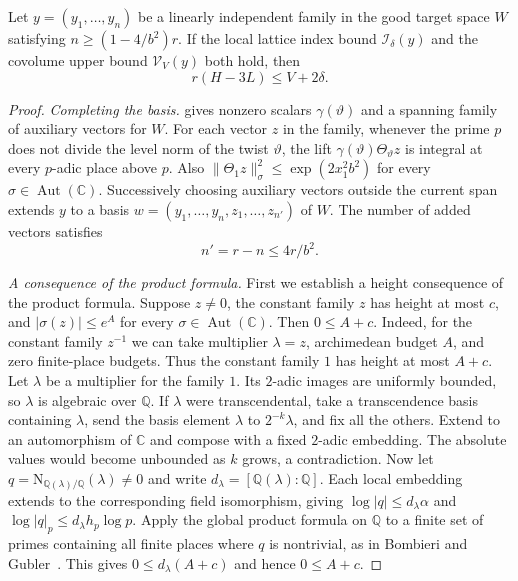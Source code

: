 \begin{theorem}
\label{thm:long-forms}
\emitthmsource
Let $y=(y_1,\dots,y_n)$ be a linearly independent family in the good target space $W$ satisfying $n\ge(1-4/b^2)r$. If the local lattice index bound $\mathcal I_\delta(y)$ and the covolume upper bound $\mathcal V_V(y)$ both hold, then
\begin{equation}
  r(H-3L)\le V+2\delta.
\label{eq:c-long-forms}
\end{equation}
\end{theorem}
\begin{proof}
\emph{Completing the basis.}
 gives nonzero scalars $\gamma(\vartheta)$ and a spanning family of auxiliary vectors for $W$. For each vector $z$ in the family, whenever the prime $p$ does not divide the level norm of the twist $\vartheta$, the lift $\gamma(\vartheta)\Theta_\vartheta z$ is integral at every $p$-adic place above $p$. Also $\|\Theta_1 z\|_\sigma^2\le \exp(2x_1^2b^2)$ for every $\sigma\in\operatorname{Aut}(\mathbb C)$. Successively choosing auxiliary vectors outside the current span extends $y$ to a basis $w=(y_1,\dots,y_n,z_1,\dots,z_{n'})$ of $W$. The number of added vectors satisfies
\[
 n'=r-n\le 4r/b^2.
\]

\emph{A consequence of the product formula.}
First we establish a height consequence of the product formula. Suppose $z\ne0$, the constant family $z$ has height at most $c$, and $|\sigma(z)|\le e^A$ for every $\sigma\in\operatorname{Aut}(\mathbb C)$. Then $0\le A+c$. Indeed, for the constant family $z^{-1}$ we can take multiplier $\lambda=z$, archimedean budget $A$, and zero finite-place budgets. Thus the constant family $1$ has height at most $A+c$. Let $\lambda$ be a multiplier for the family $1$. Its $2$-adic images are uniformly bounded, so $\lambda$ is algebraic over $\mathbb Q$. If $\lambda$ were transcendental, take a transcendence basis containing $\lambda$, send the basis element $\lambda$ to $2^{-k}\lambda$, and fix all the others. Extend to an automorphism of $\mathbb C$ and compose with a fixed $2$-adic embedding. The absolute values would become unbounded as $k$ grows, a contradiction. Now let $q=\mathrm N_{\mathbb Q(\lambda)/\mathbb Q}(\lambda)\ne0$ and write $d_\lambda=[\mathbb Q(\lambda):\mathbb Q]$. Each local embedding extends to the corresponding field isomorphism, giving $\log |q|\le d_\lambda\alpha$ and $\log |q|_p\le d_\lambda h_p\log p$. Apply the global product formula on $\mathbb Q$ to a finite set of primes containing all finite places where $q$ is nontrivial, as in Bombieri and Gubler~\cite{BombieriGubler2006}. This gives $0\le d_\lambda(A+c)$ and hence $0\le A+c$.


\end{proof}
